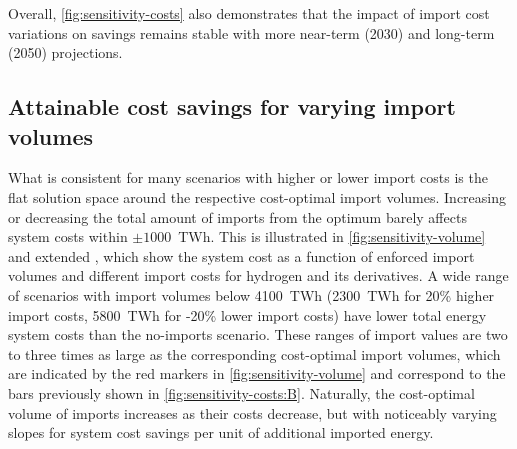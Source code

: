 Overall, \cref{fig:sensitivity-costs} also demonstrates that the impact of
import cost variations on savings remains stable with more near-term (2030) and
long-term (2050) projections.

\begin{figure}
\end{figure}

\subsection*{Attainable cost savings for varying import volumes}
\label{sec:results-5}

What is consistent for many scenarios with higher or lower import costs is the
flat solution space around the respective cost-optimal import volumes.
Increasing or decreasing the total amount of imports from the optimum barely
affects system costs within $\pm 1000$~TWh. This is illustrated in
\cref{fig:sensitivity-volume} and extended
,
which show the system cost as a function of enforced import volumes and
different import costs for hydrogen and its derivatives. A wide range of
scenarios with import volumes below 4100~TWh (2300~TWh for 20\% higher import
costs, 5800~TWh for -20\% lower import costs) have lower total energy system
costs than the no-imports scenario. These ranges of import values are two to
three times as large as the corresponding cost-optimal import volumes, which are
indicated by the red markers in \cref{fig:sensitivity-volume} and correspond to
the bars previously shown in \cref{fig:sensitivity-costs:B}. Naturally, the
cost-optimal volume of imports increases as their costs decrease, but with
noticeably varying slopes for system cost savings per unit of additional
imported energy.

